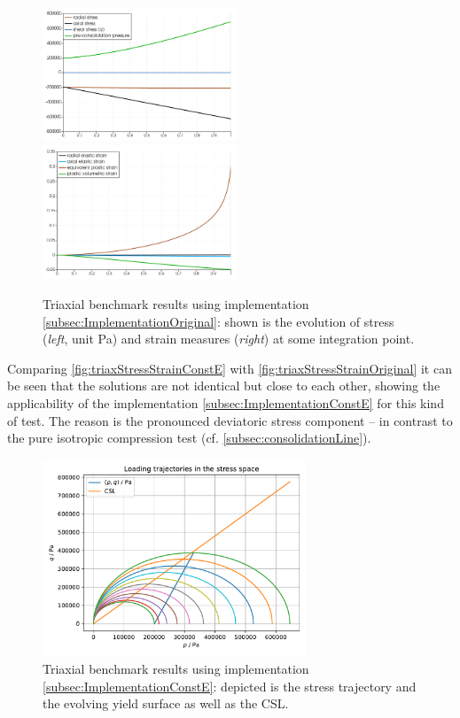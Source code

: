 \documentclass[paper=a4, twoside, pagesize]{scrartcl}
\begin{document}
\begin{figure}[h!]
  \vspace{-6mm}
  \includegraphics[width=0.52\textwidth]{img/SemiExplicitModifiedCamClay_OpenGeoSys2023/TriaxCamClay_StressControl_StressCurves_Original.png}
  \includegraphics[width=0.52\textwidth]{img/SemiExplicitModifiedCamClay_OpenGeoSys2023/TriaxCamClay_StressControl_StrainCurves_Original.png}
  \caption{Triaxial benchmark results using implementation \ref{subsec:ImplementationOriginal}: shown is the evolution of stress (\textsl{left}, unit Pa) and strain measures (\textsl{right}) at some integration point.}\label{fig:triaxStressStrainOriginal}
\end{figure}
\par
\noindent
Comparing \autoref{fig:triaxStressStrainConstE} with \autoref{fig:triaxStressStrainOriginal} it can be seen that the solutions are not identical but close to each other, showing the applicability of the implementation \ref{subsec:ImplementationConstE} for this kind of test. The reason is the pronounced deviatoric stress component -- in contrast to the pure isotropic compression test (cf. \autoref{subsec:consolidationLine}).
\begin{figure}[h!]\centering
  \vspace{-12mm}
  \includegraphics[width=0.7\textwidth]{img/SemiExplicitModifiedCamClay_OpenGeoSys2023/ModCamClay_TriaxStudy_YieldSurface_41.pdf}
  \caption{Triaxial benchmark results using implementation \ref{subsec:ImplementationConstE}: depicted is the stress trajectory and the evolving yield surface as well as the CSL.}\label{fig:triaxStressTrajectory}
\end{figure}
\end{document}
